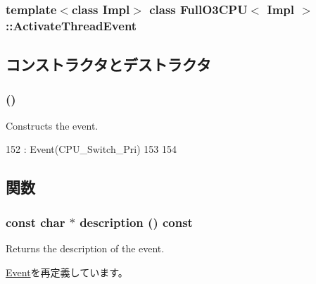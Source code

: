\subsubsection*{template$<$class Impl$>$ class FullO3CPU$<$ Impl $>$::ActivateThreadEvent}



\subsection{コンストラクタとデストラクタ}
\hypertarget{classFullO3CPU_1_1ActivateThreadEvent_a9ce281f466d06de2e43efe49b6918c14}{
\subsubsection[{ActivateThreadEvent}]{ ()}}
\label{classFullO3CPU_1_1ActivateThreadEvent_a9ce281f466d06de2e43efe49b6918c14}
Constructs the event. 


\begin{DoxyCode}
152     : Event(CPU_Switch_Pri)
153 {
154 }
\end{DoxyCode}


\subsection{関数}
\hypertarget{classFullO3CPU_1_1ActivateThreadEvent_a5a14fe478e2393ff51f02e9b7be27e00}{
\subsubsection[{description}]{\setlength{\rightskip}{0pt plus 5cm}const char $\ast$ description () const}}
\label{classFullO3CPU_1_1ActivateThreadEvent_a5a14fe478e2393ff51f02e9b7be27e00}
Returns the description of the event. 

\hyperlink{classEvent_a130ddddf003422b413e2e891b1b80e8f}{Event}を再定義しています。


